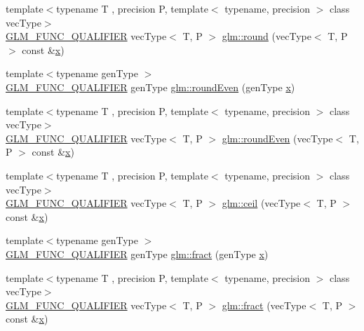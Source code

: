 \begin{DoxyCompactItemize}
{\footnotesize template$<$typename T , precision P, template$<$ typename, precision $>$ class vec\+Type$>$ }\\\mbox{\hyperlink{setup_8hpp_a33fdea6f91c5f834105f7415e2a64407}{G\+L\+M\+\_\+\+F\+U\+N\+C\+\_\+\+Q\+U\+A\+L\+I\+F\+I\+ER}} vec\+Type$<$ T, P $>$ \mbox{\hyperlink{group__core__func__common_gada0165544c0618d634c8056a88082ce9}{glm\+::round}} (vec\+Type$<$ T, P $>$ const \&\mbox{\hyperlink{glad_8h_a92d0386e5c19fb81ea88c9f99644ab1d}{x}})
\item 
{\footnotesize template$<$typename gen\+Type $>$ }\\\mbox{\hyperlink{setup_8hpp_a33fdea6f91c5f834105f7415e2a64407}{G\+L\+M\+\_\+\+F\+U\+N\+C\+\_\+\+Q\+U\+A\+L\+I\+F\+I\+ER}} gen\+Type \mbox{\hyperlink{namespaceglm_ae02684863360f29d6e9fb9b5ad4ab5d9}{glm\+::round\+Even}} (gen\+Type \mbox{\hyperlink{glad_8h_a92d0386e5c19fb81ea88c9f99644ab1d}{x}})
\item 
{\footnotesize template$<$typename T , precision P, template$<$ typename, precision $>$ class vec\+Type$>$ }\\\mbox{\hyperlink{setup_8hpp_a33fdea6f91c5f834105f7415e2a64407}{G\+L\+M\+\_\+\+F\+U\+N\+C\+\_\+\+Q\+U\+A\+L\+I\+F\+I\+ER}} vec\+Type$<$ T, P $>$ \mbox{\hyperlink{group__core__func__common_ga655598104195a60a950291485e84a97e}{glm\+::round\+Even}} (vec\+Type$<$ T, P $>$ const \&\mbox{\hyperlink{glad_8h_a92d0386e5c19fb81ea88c9f99644ab1d}{x}})
\item 
{\footnotesize template$<$typename T , precision P, template$<$ typename, precision $>$ class vec\+Type$>$ }\\\mbox{\hyperlink{setup_8hpp_a33fdea6f91c5f834105f7415e2a64407}{G\+L\+M\+\_\+\+F\+U\+N\+C\+\_\+\+Q\+U\+A\+L\+I\+F\+I\+ER}} vec\+Type$<$ T, P $>$ \mbox{\hyperlink{group__core__func__common_ga9189b2bec45ff301923ea8f8dd157fb8}{glm\+::ceil}} (vec\+Type$<$ T, P $>$ const \&\mbox{\hyperlink{glad_8h_a92d0386e5c19fb81ea88c9f99644ab1d}{x}})
\item 
{\footnotesize template$<$typename gen\+Type $>$ }\\\mbox{\hyperlink{setup_8hpp_a33fdea6f91c5f834105f7415e2a64407}{G\+L\+M\+\_\+\+F\+U\+N\+C\+\_\+\+Q\+U\+A\+L\+I\+F\+I\+ER}} gen\+Type \mbox{\hyperlink{group__core__func__common_ga8ba89e40e55ae5cdf228548f9b7639c7}{glm\+::fract}} (gen\+Type \mbox{\hyperlink{glad_8h_a92d0386e5c19fb81ea88c9f99644ab1d}{x}})
\item 
{\footnotesize template$<$typename T , precision P, template$<$ typename, precision $>$ class vec\+Type$>$ }\\\mbox{\hyperlink{setup_8hpp_a33fdea6f91c5f834105f7415e2a64407}{G\+L\+M\+\_\+\+F\+U\+N\+C\+\_\+\+Q\+U\+A\+L\+I\+F\+I\+ER}} vec\+Type$<$ T, P $>$ \mbox{\hyperlink{group__core__func__common_ga950ab967a4406f596b7c6c14af091874}{glm\+::fract}} (vec\+Type$<$ T, P $>$ const \&\mbox{\hyperlink{glad_8h_a92d0386e5c19fb81ea88c9f99644ab1d}{x}})

\end{DoxyCompactItemize}
